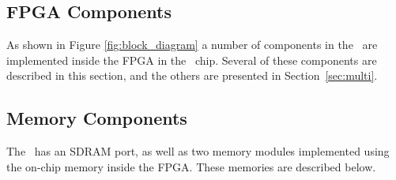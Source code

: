 \subsection{FPGA Components}
\label{sec:fpga}
As shown in Figure \ref{fig:block_diagram} a number of components in the \systemNameFull~are 
implemented inside the FPGA in the \FPGADeviceFamily~chip.  Several of these components 
are described in this section, and the others are presented in Section~\ref{sec:multi}.





\subsection{Memory Components}
The \systemNameFull~has an SDRAM port, as well as two memory modules implemented using the 
on-chip memory inside the FPGA. These memories are described below.






















